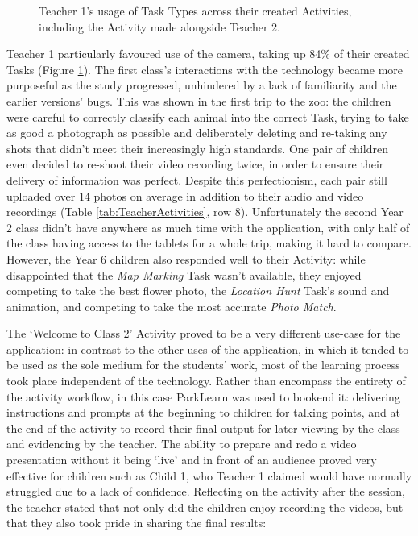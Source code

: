 \begin{figure}
    \centering
    \caption[Teacher 1's usage of Task Types across their created Activities]{Teacher 1's usage of Task Types across their created Activities, including the Activity made alongside Teacher 2.}
    \label{fig:TaskTypeUsage}
\end{figure}

Teacher 1 particularly favoured use of the camera, taking up 84\% of their created Tasks (Figure \ref{fig:TaskTypeUsage}). The first class's interactions with the technology became more purposeful as the study progressed, unhindered by a lack of familiarity and the earlier versions' bugs. This was shown in the first trip to the zoo: the children were careful to correctly classify each animal into the correct Task, trying to take as good a photograph as possible and deliberately deleting and re-taking any shots that didn't meet their increasingly high standards. One pair of children even decided to re-shoot their video recording twice, in order to ensure their delivery of information was perfect. Despite this perfectionism, each pair still uploaded over 14 photos on average in addition to their audio and video recordings (Table \ref{tab:TeacherActivities}, row 8). Unfortunately the second Year 2 class didn't have anywhere as much time with the application, with only half of the class having access to the tablets for a whole trip, making it hard to compare. However, the Year 6 children also responded well to their Activity: while disappointed that the \textit{Map Marking} Task wasn't available, they enjoyed competing to take the best flower photo, the \textit{Location Hunt} Task’s sound and animation, and competing to take the most accurate \textit{Photo Match}.

The `Welcome to Class 2' Activity proved to be a very different use-case for the application: in contrast to the other uses of the application, in which it tended to be used as the sole medium for the students' work, most of the learning process took place independent of the technology. Rather than encompass the entirety of the activity workflow, in this case ParkLearn was used to bookend it: delivering instructions and prompts at the beginning to children for talking points, and at the end of the activity to record their final output for later viewing by the class and evidencing by the teacher. The ability to prepare and redo a video presentation without it being `live' and in front of an audience proved very effective for children such as Child 1, who Teacher 1 claimed would have normally struggled due to a lack of confidence. Reflecting on the activity after the session, the teacher stated that not only did the children enjoy recording the videos, but that they also took pride in sharing the final results: 


